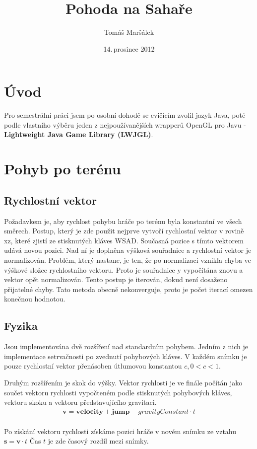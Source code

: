 \documentclass{zcu_sp}
\title{Pohoda na Sahaře}
\author{Tomáš Maršálek}
\date{14.\,prosince 2012}
\begin{document}
\maketitle
\section{Úvod}
Pro semestrální práci jsem po osobní dohodě se cvičícím zvolil jazyk Java, poté
podle vlastního výběru jeden z nejpoužívanějších wrapperů OpenGL pro Javu -
\textbf {Lightweight Java Game Library (LWJGL)}.

\section{Pohyb po terénu}
\subsection{Rychlostní vektor}
Požadavkem je, aby rychlost pohybu hráče po terénu byla konstantní ve všech
směrech. Postup, který je zde použit nejprve vytvoří rychlostní vektor v rovině
xz, které zjistí ze stisknutých kláves WSAD. Současná pozice s tímto vektorem
udává novou pozici. Nad ní je doplněna výšková souřadnice a rychlostní vektor
je normalizován. Problém, který nastane, je ten, že po normalizaci vznikla
chyba ve výškové složce rychlostního vektoru. Proto je souřadnice y vypočítána
znovu a vektor opět normalizován. Tento postup je iterován, dokud není dosaženo
přijatelné chyby. Tato metoda obecně nekonverguje, proto je počet iterací
omezen konečnou hodnotou.

\subsection{Fyzika}
Jsou implementována dvě rozšíření nad standardním pohybem. Jedním z nich je implementace setrvačnosti po zvednutí pohybových kláves. V každém snímku je pouze rychlostní vektor přenásoben útlumovou konstantou $c, 0 < c < 1$.

Druhým rozšířením je skok do výšky. Vektor rychlosti je ve finále počítán jako
součet vektoru rychlosti vypočteném podle stisknutých pohybových kláves,
vektoru skoku a vektoru představujícího gravitaci.
\begin{align*}
\mathbf{v} = \mathbf{velocity}+ \mathbf{jump} - gravityConstant \cdot t \\
\end{align*}

Po získání vektoru rychlosti získáme pozici hráče v novém snímku ze vztahu
$\mathbf{s} = \mathbf{v} \cdot t$
Čas $t$ je zde časový rozdíl mezi snímky.
\end{document}
